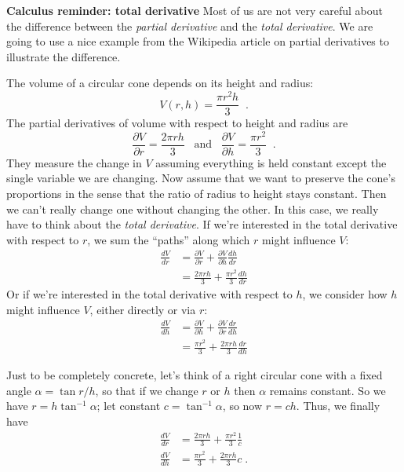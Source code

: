 \begin{examplebox} {\bf Calculus reminder: total derivative} Most of
  us are not very careful about the difference between the {\em
      partial derivative} and the {\em total derivative}.  We are going
  to use a nice example from the Wikipedia article on partial
  derivatives to illustrate the difference.

  The volume of a circular cone depends on its height and radius:
  \begin{equation}
    V(r, h) = \frac{\pi r^2 h}{3}\;\;.
  \end{equation}
  The partial derivatives of volume with respect to height and radius
  are
  \begin{equation}
    \frac{\partial V}{\partial r} = \frac{2\pi r
      h}{3}\;\;\;\text{and}\;\;\;
    \frac{\partial V}{\partial h} = \frac{\pi r^2}{3}\;\;.
  \end{equation}
  They measure the change in $V$ assuming everything is held constant
  except the single variable we are changing.
  Now assume that we want to preserve the cone's proportions in the sense that the ratio of radius to height stays constant.
  Then we can't really change one without changing the other.
  In this case, we really have to think about the {\em total derivative}.
  If we're interested in the total derivative with respect to $r$, we sum the ``paths'' along which $r$ might influence $V$:
  \begin{align}
    \frac{dV}{dr} & = \frac{\partial V}{\partial r} + \frac{\partial
    V}{\partial h} \frac{dh}{dr}                                            \\
                  & = \frac{2 \pi r h}{3} + \frac{\pi r^2}{3} \frac{dh}{dr}
  \end{align}
  Or if we're interested in the total derivative with respect to $h$, we consider how $h$ might influence $V$, either directly or via $r$:
  \begin{align}
    \frac{dV}{dh} & = \frac{\partial V}{\partial h} + \frac{\partial
    V}{\partial r} \frac{dr}{dh}                                            \\
                  & = \frac{\pi r^2}{3} + \frac{2 \pi r h}{3} \frac{dr}{dh}
  \end{align}

  Just to be completely concrete, let's think of a right circular cone
  with a fixed angle $\alpha = \tan r / h$, so that if we change $r$ or
  $h$ then $\alpha$ remains constant.  So we have $r = h \tan^{-1}
    \alpha$;  let constant $c = \tan^{-1} \alpha$, so now $r = c h$.
  Thus, we finally have
  \begin{align}
    \frac{dV}{dr} & = \frac{2 \pi r h}{3} + \frac{\pi r^2}{3} \frac{1}{c} \\
    \frac{dV}{dh} & = \frac{\pi r^2}{3} + \frac{2 \pi r h}{3} c \; .
  \end{align}

\end{examplebox}

